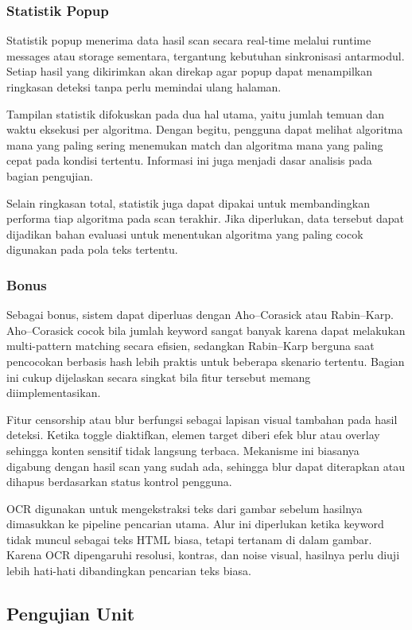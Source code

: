 \subsubsection{Statistik Popup}
Statistik popup menerima data hasil scan secara real-time melalui runtime messages atau storage sementara, tergantung kebutuhan sinkronisasi antarmodul. Setiap hasil yang dikirimkan akan direkap agar popup dapat menampilkan ringkasan deteksi tanpa perlu memindai ulang halaman.

Tampilan statistik difokuskan pada dua hal utama, yaitu jumlah temuan dan waktu eksekusi per algoritma. Dengan begitu, pengguna dapat melihat algoritma mana yang paling sering menemukan match dan algoritma mana yang paling cepat pada kondisi tertentu. Informasi ini juga menjadi dasar analisis pada bagian pengujian.

Selain ringkasan total, statistik juga dapat dipakai untuk membandingkan performa tiap algoritma pada scan terakhir. Jika diperlukan, data tersebut dapat dijadikan bahan evaluasi untuk menentukan algoritma yang paling cocok digunakan pada pola teks tertentu.

\subsubsection{Bonus}
Sebagai bonus, sistem dapat diperluas dengan Aho--Corasick atau Rabin--Karp. Aho--Corasick cocok bila jumlah keyword sangat banyak karena dapat melakukan multi-pattern matching secara efisien, sedangkan Rabin--Karp berguna saat pencocokan berbasis hash lebih praktis untuk beberapa skenario tertentu. Bagian ini cukup dijelaskan secara singkat bila fitur tersebut memang diimplementasikan.

Fitur censorship atau blur berfungsi sebagai lapisan visual tambahan pada hasil deteksi. Ketika toggle diaktifkan, elemen target diberi efek blur atau overlay sehingga konten sensitif tidak langsung terbaca. Mekanisme ini biasanya digabung dengan hasil scan yang sudah ada, sehingga blur dapat diterapkan atau dihapus berdasarkan status kontrol pengguna.

OCR digunakan untuk mengekstraksi teks dari gambar sebelum hasilnya dimasukkan ke pipeline pencarian utama. Alur ini diperlukan ketika keyword tidak muncul sebagai teks HTML biasa, tetapi tertanam di dalam gambar. Karena OCR dipengaruhi resolusi, kontras, dan noise visual, hasilnya perlu diuji lebih hati-hati dibandingkan pencarian teks biasa.

\subsection{Pengujian Unit}

